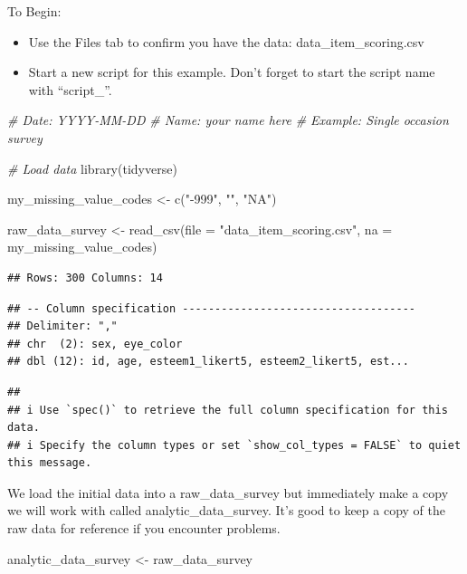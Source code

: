 \documentclass[
]{krantz}
\makeatletter
\newenvironment{Shaded}{\begin{snugshade}}{\end{snugshade}}
\newcommand{\AttributeTok}[1]{\textcolor[rgb]{0.61,0.61,0.61}{#1}}
\newcommand{\CommentTok}[1]{\textcolor[rgb]{0.37,0.37,0.37}{\textit{#1}}}
\newcommand{\FunctionTok}[1]{\textcolor[rgb]{0,0,0}{#1}}
\newcommand{\NormalTok}[1]{#1}
\newcommand{\OtherTok}[1]{\textcolor[rgb]{0.37,0.37,0.37}{#1}}
\newcommand{\StringTok}[1]{\textcolor[rgb]{0.5,0.5,0.5}{#1}}
\newenvironment{kframe}{%
\medskip{}
\setlength{\fboxsep}{.8em}
 \def\at@end@of@kframe{}%
 \ifinner\ifhmode%
  \def\at@end@of@kframe{\end{minipage}}%
  \begin{minipage}{\columnwidth}%
 \fi\fi%
 \def\FrameCommand##1{\hskip\@totalleftmargin \hskip-\fboxsep
 \colorbox{shadecolor}{##1}\hskip-\fboxsep
     \hskip-\linewidth \hskip-\@totalleftmargin \hskip\columnwidth}%
 \MakeFramed {\advance\hsize-\width
   \@totalleftmargin\z@ \linewidth\hsize
   \@setminipage}}%
 {\par\unskip\endMakeFramed%
 \at@end@of@kframe}
\renewenvironment{Shaded}{\begin{kframe}}{\end{kframe}}
\makeatother
\begin{document}
To Begin:

\begin{itemize}
\item
  Use the Files tab to confirm you have the data: data\_item\_scoring.csv
\item
  Start a new script for this example. Don't forget to start the script name with ``script\_''.
\end{itemize}

\begin{Shaded}
\begin{Highlighting}[]
\CommentTok{\# Date: YYYY{-}MM{-}DD}
\CommentTok{\# Name: your name here}
\CommentTok{\# Example: Single occasion survey}

\CommentTok{\# Load data}
\FunctionTok{library}\NormalTok{(tidyverse)}

\NormalTok{my\_missing\_value\_codes }\OtherTok{\textless{}{-}} \FunctionTok{c}\NormalTok{(}\StringTok{"{-}999"}\NormalTok{, }\StringTok{""}\NormalTok{, }\StringTok{"NA"}\NormalTok{)}

\NormalTok{raw\_data\_survey }\OtherTok{\textless{}{-}} \FunctionTok{read\_csv}\NormalTok{(}\AttributeTok{file =} \StringTok{"data\_item\_scoring.csv"}\NormalTok{,}
                     \AttributeTok{na =}\NormalTok{ my\_missing\_value\_codes)}
\end{Highlighting}
\end{Shaded}

\begin{verbatim}
## Rows: 300 Columns: 14
\end{verbatim}

\begin{verbatim}
## -- Column specification ------------------------------------
## Delimiter: ","
## chr  (2): sex, eye_color
## dbl (12): id, age, esteem1_likert5, esteem2_likert5, est...
\end{verbatim}

\begin{verbatim}
## 
## i Use `spec()` to retrieve the full column specification for this data.
## i Specify the column types or set `show_col_types = FALSE` to quiet this message.
\end{verbatim}

We load the initial data into a raw\_data\_survey but immediately make a copy we will work with called analytic\_data\_survey. It's good to keep a copy of the raw data for reference if you encounter problems.

\begin{Shaded}
\begin{Highlighting}[]
\NormalTok{analytic\_data\_survey }\OtherTok{\textless{}{-}}\NormalTok{ raw\_data\_survey}
\end{Highlighting}
\end{Shaded}
\end{document}
